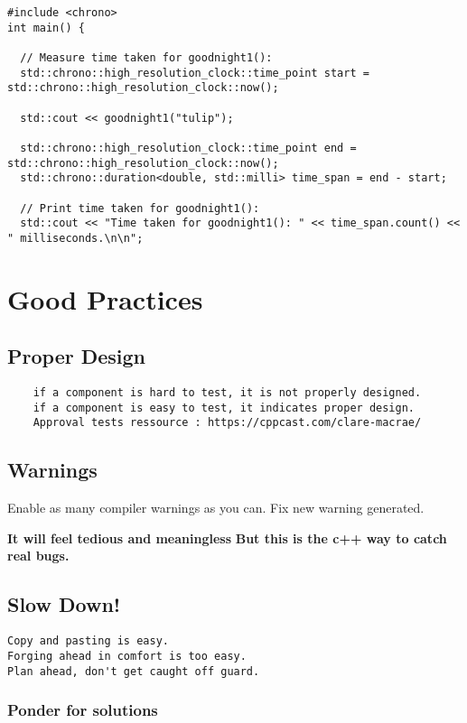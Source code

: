 \begin{verbatim}
#include <chrono>
int main() {

  // Measure time taken for goodnight1():
  std::chrono::high_resolution_clock::time_point start = std::chrono::high_resolution_clock::now();

  std::cout << goodnight1("tulip");

  std::chrono::high_resolution_clock::time_point end = std::chrono::high_resolution_clock::now();
  std::chrono::duration<double, std::milli> time_span = end - start;

  // Print time taken for goodnight1():
  std::cout << "Time taken for goodnight1(): " << time_span.count() << " milliseconds.\n\n";
\end{verbatim}

\chapter{Good Practices}

\section{Proper Design}

\begin{verbatim}
    if a component is hard to test, it is not properly designed. 
    if a component is easy to test, it indicates proper design. 
    Approval tests ressource : https://cppcast.com/clare-macrae/ 
\end{verbatim}

\section{Warnings}

Enable as many compiler warnings as you can. 
Fix new warning generated. 

\textbf{It will feel tedious and meaningless}
\textbf{But this is the c++ way to catch real bugs.}

\section{Slow Down!}

\begin{verbatim}
Copy and pasting is easy. 
Forging ahead in comfort is too easy.
Plan ahead, don't get caught off guard. 
\end{verbatim}

\subsection{Ponder for solutions}

